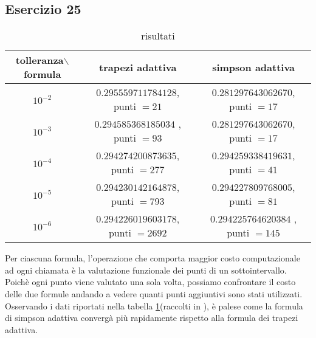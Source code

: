 \subsection{Esercizio 25}


\begin{table}[h]
\begin{tabular}{|c |c |c|}
        \hline
        tolleranza$\backslash$formula & trapezi adattiva          &simpson adattiva\\
        \hline
        $10^{-2}$                     &$0.295559711784128$,  punti $= 21$      &$0.281297643062670$,  punti $= 17$  \\
        \hline
        $10^{-3}$                     &$0.294585368185034$ , punti $= 93$     &$0.281297643062670$,  punti $= 17$  \\
        \hline
        $10^{-4}$                     &$0.294274200873635$,  punti $= 277$      &$0.294259338419631$, punti $= 41$  \\
        \hline
        $10^{-5}$                     &$0.294230142164878$, punti $= 793$      &$0.294227809768005$,  punti $= 81$  \\
        \hline
        $10^{-6}$                     &$0.294226019603178$,  punti $= 2692$      &$0.294225764620384$ ,  punti $= 145$ \\
        \hline
    \end{tabular}
    \caption{risultati}
    \label{tab:25}
\end{table}
Per ciascuna formula, l'operazione che comporta maggior costo computazionale ad ogni chiamata è la valutazione funzionale dei punti di un sottointervallo.
Poichè ogni punto viene valutato una sola volta, possiamo confrontare il costo delle due formule andando a vedere quanti punti aggiuntivi sono stati utilizzati.
Osservando i dati riportati nella tabella \ref{tab:25}(raccolti in ), è palese come la formula di simpson adattiva convergà più rapidamente rispetto alla formula dei trapezi adattiva.
